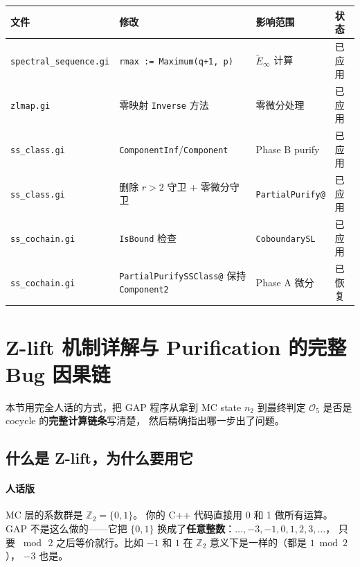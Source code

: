 \documentclass[a4paper,fontset=ubuntu,12pt]{ctexart}
\begin{document}
\begin{center}
\begin{tabular}{llll}
\hline
文件 & 修改 & 影响范围 & 状态 \\
\hline
\texttt{spectral\_sequence.gi} & \texttt{rmax := Maximum(q+1, p)} & $\tilde{E}_\infty$ 计算 & 已应用 \\
\texttt{zlmap.gi} & 零映射 \texttt{Inverse} 方法 & 零微分处理 & 已应用 \\
\texttt{ss\_class.gi} & \texttt{ComponentInf}/\texttt{Component} & Phase B purify & 已应用 \\
\texttt{ss\_class.gi} & 删除 $r>2$ 守卫 + 零微分守卫 & \texttt{PartialPurify@} & 已应用 \\
\texttt{ss\_cochain.gi} & \texttt{IsBound} 检查 & \texttt{CoboundarySL} & 已应用 \\
\texttt{ss\_cochain.gi} & \texttt{PartialPurifySSClass@} 保持 \texttt{Component2} & Phase A 微分 & 已恢复 \\
\hline
\end{tabular}
\end{center}


\section{Z-lift 机制详解与 Purification 的完整 Bug 因果链}
\label{sec:zlift-and-purify-chain}

本节用完全人话的方式，把 GAP 程序从拿到 MC state $n_2$ 到最终判定 $\mathcal{O}_5$ 是否是 cocycle 的\textbf{完整计算链条}写清楚，
然后精确指出哪一步出了问题。

\subsection{什么是 Z-lift，为什么要用它}
\label{sec:what-is-zlift}

\paragraph{人话版}
MC 层的系数群是 $\mathbb{Z}_2 = \{0, 1\}$。
你的 C++ 代码直接用 0 和 1 做所有运算。
GAP 不是这么做的——它把 $\{0,1\}$ 换成了\textbf{任意整数}：$\ldots, -3, -1, 0, 1, 2, 3, \ldots$，
只要 $\bmod\,2$ 之后等价就行。比如 $-1$ 和 $1$ 在 $\mathbb{Z}_2$ 意义下是一样的（都是 $1 \bmod 2$），
$-3$ 也是。
\end{document}
